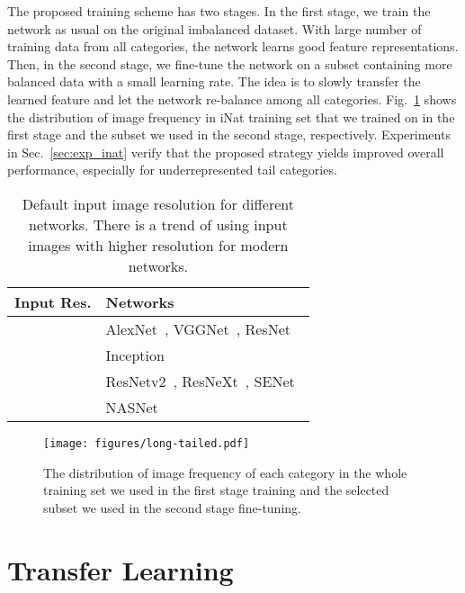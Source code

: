 \documentclass[10pt,twocolumn,letterpaper]{article}
\begin{document}
The proposed training scheme has two stages.
In the first stage, we train the network as usual on the original imbalanced dataset.
With large number of training data from all categories, the network learns good feature representations.
Then, in the second stage, we fine-tune the network on a subset containing more balanced data with a small learning rate.
The idea is to slowly transfer the learned feature and let the network re-balance among all categories.
Fig.\ \ref{fig:long-tailed} shows the distribution of image frequency in iNat training set that we trained on in the first stage and the subset we used in the second stage, respectively.
Experiments in Sec.~\ref{sec:exp_inat} verify that the proposed strategy yields improved overall performance, especially for underrepresented tail categories.


\begin{table}[t]
\small
\begin{center}
\begin{tabular}{ |l|l| } 
\hline
Input Res. & Networks \\ \hline
 & AlexNet~\cite{alexnet}, VGGNet~\cite{vggnet}, ResNet~\cite{resnet} \\
 & Inception~\cite{googlenet, inception-v3, inception-v4} \\
 & ResNetv2~\cite{resnet-v2}, ResNeXt~\cite{resnext}, SENet~\cite{senet} \\
 & NASNet~\cite{nasnet} \\ \hline
\end{tabular}
\end{center}
\caption{Default input image resolution for different networks.
There is a trend of using input images with higher resolution for modern networks.
}
\label{tab:input_size}
\end{table}


\begin{figure}[t]
\centering
\texttt{[image: figures/long-tailed.pdf]}
\caption{The distribution of image frequency of each category in the whole training set we used in the first stage training and the selected subset we used in the second stage fine-tuning.}
\label{fig:long-tailed}
\end{figure}




\section{Transfer Learning}
\label{sec:transfer_learning}
\end{document}
